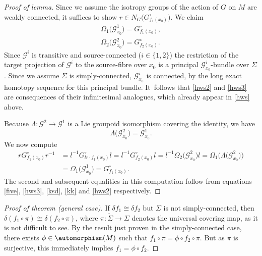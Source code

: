 \begin{proof}[Proof of lemma] Since we assume the isotropy groups of
the action of $G$ on $M$ are weakly connected, it suffices to show $r
\in N_G\big(G_{f_1(x_0)}^\circ\big)$. We claim
 \begin{gather}
 \Omega_1\big({\mathcal G}^1_{x_0}\big)=G_{f_1(x_0)}^\circ ,\label{hws2}
 \\
\Omega_2\big({\mathcal G}^2_{x_0}\big)=G_{f_2(x_0)}^\circ.\label{hws3}
 \end{gather}
 Since ${\mathcal G}^i$ is transitive and
source-connected ($i \in \{1,2\}$) the restriction of the target
projection of ${\mathcal G}^i$ to the source-fibre over $x_0$ is a
principal ${\mathcal G}^i_{x_0}$-bundle over $\Sigma $. Since we
assume $\Sigma $ is simply-connected, ${\mathcal G}^i_{x_0}$ is
connected, by the long exact homotopy sequence for this principal
bundle. It~follows that \eqref{hws2} and \eqref{hws3} are consequences
of their infinitesimal analogues, which already appear in \eqref{hws}
above.

 Because $\Lambda \colon {\mathcal G}^2 \rightarrow {\mathcal G}^1$
is a Lie groupoid isomorphism covering the identity, we have
 \begin{equation}
 \Lambda \big({\mathcal G}^2_{x_0}\big) ={\mathcal G}^1_{x_0}.\label{kk}
 \end{equation}
 We now compute
 \begin{align*}
 r G_{f_1(x_0)}^\circ r^{-1} &= l^{-1}G_{lr \cdot
f_1(x_0)}^\circ l = l^{-1}G_{f_2(x_0)}^\circ l=l^{-1} \Omega_2
\big({\mathcal G}^2_{x_0}\big)l = \Omega_1
\big(\Lambda\big({\mathcal G}^2_{x_0}\big)\big)
\\
&=\Omega_1 \big({\mathcal
G}^1_{x_0}\big)=G_{f_1(x_0)}^\circ.
 \end{align*}
 The second and subsequent equalities in this
computation follow from equations \eqref{five}, \eqref{hws3},
\eqref{ksd}, \eqref{kk} and \eqref{hws2} respectively.
\end{proof}

\begin{proof}[Proof of theorem {\normalfont(general case)}]\sloppy If $\delta f_1 \cong
\delta f_2$ but $\Sigma $ is not simply-connected, then \mbox{$\delta(f_1
\circ \pi)\cong \delta(f_2 \circ \pi)$}, where $\pi \colon \tilde
\Sigma \rightarrow \Sigma $ denotes the universal covering map, as it
is not difficult to see. By the result just proven in the
simply-connected case, there exists $\phi \in \automorphism(M)$ such
that $f_1 \circ \pi = \phi \circ f_2 \circ \pi $. But as $\pi $ is
surjective, this immediately implies $f_1 = \phi \circ f_2 $.
\end{proof}


